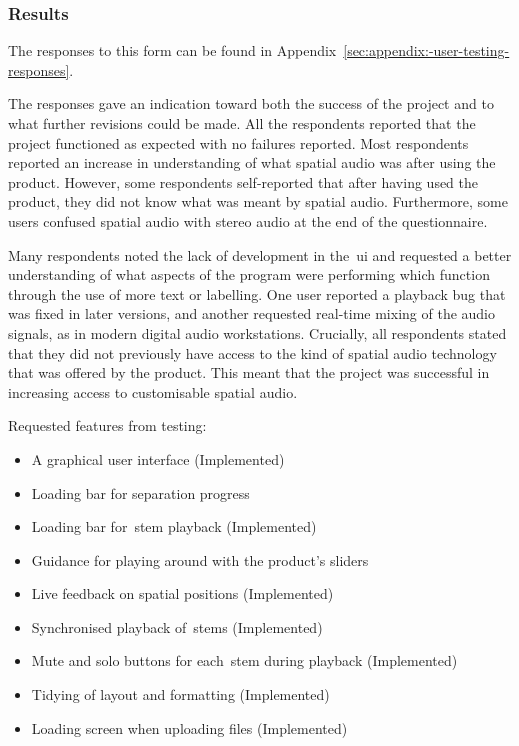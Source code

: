 \subsubsection{Results}\label{subsubsec:results}

The responses to this form can be found in Appendix~\ref{sec:appendix:-user-testing-responses}.

The responses gave an indication toward both the success of the project and to what further revisions could be made.
All the respondents reported that the project functioned as expected with no failures reported.
Most respondents reported an increase in understanding of what spatial audio was after using the product.
However, some respondents self-reported that after having used the product,
they did not know what was meant by spatial audio.
Furthermore, some users confused spatial audio with stereo audio at the end of the questionnaire.

Many respondents noted
the lack of development in the~\gls{ui} and requested a better understanding
of what aspects of the program were performing which function through the use of more text or labelling.
One user reported a playback bug that was fixed in later versions,
and another requested real-time mixing of the audio signals, as in modern digital audio workstations.
Crucially,
all respondents stated
that they did not previously have access to the kind of spatial audio technology that was offered by the product.
This meant that the project was successful in increasing access to customisable spatial audio.

Requested features from testing:

\begin{itemize}
    \item A graphical user interface (Implemented)
    \item Loading bar for separation progress
    \item Loading bar for~\gls{stem} playback (Implemented)
    \item Guidance for playing around with the product's sliders
    \item Live feedback on spatial positions (Implemented)
    \item Synchronised playback of~\glspl{stem} (Implemented)
    \item Mute and solo buttons for each~\gls{stem} during playback (Implemented)
    \item Tidying of layout and formatting (Implemented)
    \item Loading screen when uploading files (Implemented)
\end{itemize}

